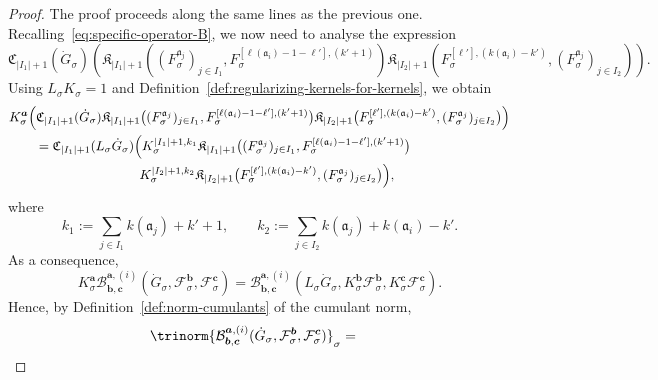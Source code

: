 \documentclass{article}
\numberwithin{equation}{section}
\newcommand{\assign}{:=}
\theoremstyle{plain}
\theoremstyle{definition}
\begin{document}
\begin{proof}
  The proof proceeds along the same lines as the previous one.
  Recalling~\eqref{eq:specific-operator-B}, we now need to analyse the
  expression
  \[ \mathfrak{C}_{| I_1 | + 1} (\dot{G}_{\sigma})  (\mathfrak{K}_{|
     I_1 | + 1} ((F_{\sigma}^{\mathfrak{a}_j})_{j \in I_1}, F_{\sigma}^{[\ell(\mathfrak a_i)-1-\ell'],(k'+1)}) \mathfrak{K}_{| I_2 | +
     1} (F_{\sigma}^{[\ell'],(k(\mathfrak a_i)-k')},
     (F_{\sigma}^{\mathfrak{a}_j})_{j \in I_2})) . \]
  Using $L_{\sigma} K_{\sigma} = 1$ and
  Definition~\ref{def:regularizing-kernels-for-kernels}, we obtain
  \[
  \begin{aligned}
  	&K_{\sigma}^{\boldsymbol{a}}\Bigl(
  	\mathfrak{C}_{|I_1|+1}(\dot{G}_{\sigma})
  	\mathfrak{K}_{|I_1|+1}\bigl((F_{\sigma}^{\mathfrak{a}_j})_{j\in I_1},
  F_{\sigma}^{[\ell(\mathfrak a_i)-1-\ell'],(k'+1)}\bigr)
  	\mathfrak{K}_{|I_2|+1}\bigl(F_{\sigma}^{[\ell'],(k(\mathfrak a_i)-k')},
  	(F_{\sigma}^{\mathfrak{a}_j})_{j\in I_2}\bigr)\Bigr) \\
  	&\qquad =
  	\mathfrak{C}_{|I_1|+1}(L_{\sigma}\dot{G}_{\sigma})
  	\Bigl(
  	K_{\sigma}^{|I_1|+1,k_1}
  	\mathfrak{K}_{|I_1|+1}\bigl((F_{\sigma}^{\mathfrak{a}_j})_{j\in I_1},
  	F_{\sigma}^{[\ell(\mathfrak a_i)-1-\ell'],(k'+1)}\bigr)
  	\\
  	&\hspace{3.5cm}
  	K_{\sigma}^{|I_2|+1,k_2}
  	\mathfrak{K}_{|I_2|+1}\bigl(F_{\sigma}^{[\ell'],(k(\mathfrak a_i)-k')},
  	(F_{\sigma}^{\mathfrak{a}_j})_{j\in I_2}\bigr)
  	\Bigr),
  \end{aligned}
  \]
  where 
  \[
  k_1 \assign \sum_{j\in I_1} k(\mathfrak a_j)+k'+1,
  \qquad
  k_2 \assign \sum_{j\in I_2} k(\mathfrak a_j)
  +k(\mathfrak a_i)-k'.
  \]
  As a consequence,
  \[ K_{\sigma}^{\boldsymbol{a}} \mathcal{B}^{\boldsymbol{a}, (i)}_{\boldsymbol{b},
     \boldsymbol{c}} (\dot{G}_{\sigma}, \mathcal{F}^{\boldsymbol{b}}_{\sigma},
     \mathcal{F}^{\boldsymbol{c}}_{\sigma}) =\mathcal{B}^{\boldsymbol{a},
     (i)}_{\boldsymbol{b}, \boldsymbol{c}} (L_{\sigma} \dot{G}_{\sigma},
     K_{\sigma}^{\boldsymbol{b}} \mathcal{F}^{\boldsymbol{b}}_{\sigma},
     K_{\sigma}^{\boldsymbol{c}} \mathcal{F}^{\boldsymbol{c}}_{\sigma}) . \]
  Hence, by Definition~\ref{def:norm-cumulants} of the cumulant norm,
  \[ \begin{aligned}
       \trinorm{ \mathcal{B}^{\boldsymbol{a}, (i)}_{\boldsymbol{b},
       \boldsymbol{c}} (\dot{G}_{\sigma}, \mathcal{F}^{\boldsymbol{b}}_{\sigma},
       \mathcal{F}^{\boldsymbol{c}}_{\sigma}) }_\sigma & =

\end{aligned}\]
\end{proof}
\end{document}
